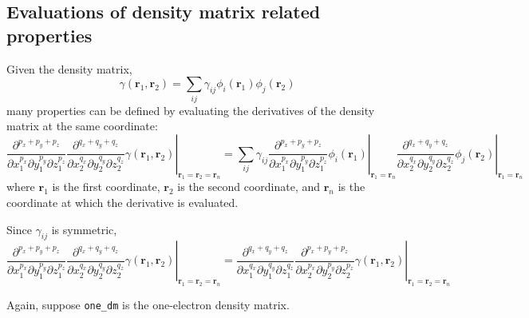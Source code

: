 \documentclass[letterpaper]{article}
\begin{document}
\subsection{Evaluations of density matrix related properties}
Given the density matrix,
\begin{equation}
  \gamma(\mathbf{r}_1, \mathbf{r}_2)
  = \sum_{ij} \gamma_{ij} \phi_i(\mathbf{r}_1) \phi_j(\mathbf{r}_2)
\end{equation}
many properties can be defined by evaluating the derivatives of the density
matrix at the same coordinate:
\begin{equation}
  \left.
    \frac{\partial^{p_x + p_y + p_z}}{\partial x_1^{p_x} \partial y_1^{p_y} \partial z_1^{p_z}}
    \frac{\partial^{q_x + q_y + q_z}}{\partial x_2^{q_x} \partial y_2^{q_y} \partial z_2^{q_z}}
    \gamma(\mathbf{r}_1, \mathbf{r}_2)
  \right|_{\mathbf{r}_1 = \mathbf{r}_2 = \mathbf{r}_n} =
  \sum_{ij} \gamma_{ij}
  \left.
    \frac{\partial^{p_x + p_y + p_z}}{\partial x_1^{p_x} \partial y_1^{p_y} \partial z_1^{p_z}}
    \phi_i(\mathbf{r}_1)
  \right|_{\mathbf{r}_1 = \mathbf{r}_n}
  \left.
    \frac{\partial^{q_x + q_y + q_z}}{\partial x_2^{q_x} \partial y_2^{q_y} \partial z_2^{q_z}}
    \phi_j(\mathbf{r}_2)
  \right|_{\mathbf{r}_1 = \mathbf{r}_n}
\end{equation}
where $\mathbf{r}_1$ is the first coordinate, $\mathbf{r}_2$ is the second
coordinate, and $\mathbf{r}_n$ is the coordinate at which the derivative is
evaluated.

Since $\gamma_{ij}$ is symmetric,
\begin{equation}
  \left.
    \frac{\partial^{p_x + p_y + p_z}}{\partial x_1^{p_x} \partial y_1^{p_y} \partial z_1^{p_z}}
    \frac{\partial^{q_x + q_y + q_z}}{\partial x_2^{q_x} \partial y_2^{q_y} \partial z_2^{q_z}}
    \gamma(\mathbf{r}_1, \mathbf{r}_2)
  \right|_{\mathbf{r}_1 = \mathbf{r}_2 = \mathbf{r}_n} =
  \left.
    \frac{\partial^{q_x + q_y + q_z}}{\partial x_1^{q_x} \partial y_1^{q_y} \partial z_1^{q_z}}
    \frac{\partial^{p_x + p_y + p_z}}{\partial x_2^{p_x} \partial y_2^{p_y} \partial z_2^{p_z}}
    \gamma(\mathbf{r}_1, \mathbf{r}_2)
  \right|_{\mathbf{r}_1 = \mathbf{r}_2 = \mathbf{r}_n}
\end{equation}

Again, suppose \verb|one_dm| is the one-electron density matrix.
\end{document}
